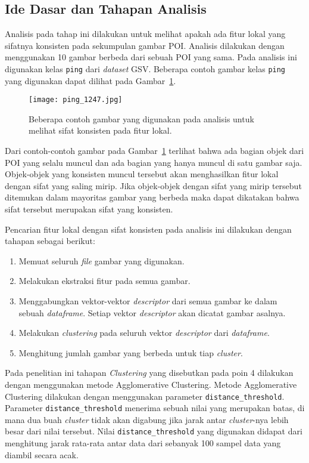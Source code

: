 \subsection{Ide Dasar dan Tahapan Analisis}
Analisis pada tahap ini dilakukan untuk melihat apakah ada fitur lokal yang sifatnya konsisten pada sekumpulan gambar POI. Analisis dilakukan dengan menggunakan 10 gambar berbeda dari sebuah POI yang sama. Pada analisis ini digunakan kelas \texttt{ping} dari \textit{dataset} GSV. Beberapa contoh gambar kelas \texttt{ping} yang digunakan dapat dilihat pada Gambar~\ref{fig:contoh_ping}.
\begin{figure}[H]
	\centering
	\texttt{[image: ping\_1247.jpg]}	
	\caption{Beberapa contoh gambar yang digunakan pada analisis untuk melihat sifat konsisten pada fitur lokal.}
	\label{fig:contoh_ping}
\end{figure}
Dari contoh-contoh gambar pada Gambar~\ref{fig:contoh_ping} terlihat bahwa ada bagian objek dari POI yang selalu muncul dan ada bagian yang hanya muncul di satu gambar saja. Objek-objek yang konsisten muncul tersebut akan menghasilkan fitur lokal dengan sifat yang saling mirip. Jika objek-objek dengan sifat yang mirip tersebut ditemukan dalam mayoritas gambar yang berbeda maka dapat dikatakan bahwa sifat tersebut merupakan sifat yang konsisten.

Pencarian fitur lokal dengan sifat konsisten pada analisis ini dilakukan dengan tahapan sebagai berikut:
\begin{enumerate}
	\item Memuat seluruh \textit{file} gambar yang digunakan.
	\item Melakukan ekstraksi fitur pada semua gambar.
	\item Menggabungkan vektor-vektor \textit{descriptor} dari semua gambar ke dalam sebuah \textit{dataframe}. Setiap vektor \textit{descriptor} akan dicatat gambar asalnya.
	\item Melakukan \textit{clustering} pada seluruh vektor \textit{descriptor} dari \textit{dataframe}.
	\item Menghitung jumlah gambar yang berbeda untuk tiap \textit{cluster}.
\end{enumerate}
Pada penelitian ini tahapan \textit{Clustering} yang disebutkan pada poin 4 dilakukan dengan menggunakan metode Agglomerative Clustering. Metode Agglomerative Clustering dilakukan dengan menggunakan parameter \texttt{distance\_threshold}. Parameter \texttt{distance\_threshold} menerima sebuah nilai yang merupakan batas, di mana dua buah \textit{cluster} tidak akan digabung jika jarak antar \textit{cluster}-nya lebih besar dari nilai tersebut. Nilai \texttt{distance\_threshold} yang digunakan didapat dari menghitung jarak rata-rata antar data dari sebanyak 100 sampel data yang diambil secara acak.

